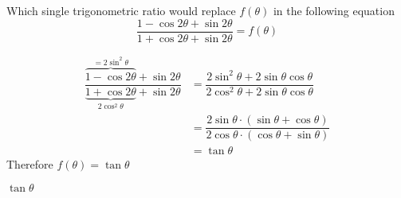 

\question[2] Which single trigonometric ratio would replace $f(\theta)$ in the 
  following equation
  \[ \dfrac{1-\cos 2\theta + \sin 2\theta}{1+\cos 2\theta + 
    \sin 2\theta} = f(\theta) \]

\begin{solution}[\halfpage]
  \begin{align}
    \dfrac{\overbrace{1-\cos 2\theta}^{=2\sin^2\theta} + \sin 2\theta}
    {\underbrace{1+\cos 2\theta}_{2\cos^2\theta} + \sin 2\theta} &= 
    \dfrac{2\sin^2\theta + 2\sin\theta\cos\theta}{2\cos^2\theta + 2\sin\theta\cos\theta} \\
    &= \dfrac{2\sin\theta\cdot (\sin\theta + \cos\theta )}
    {2\cos\theta\cdot (\cos\theta + \sin\theta)} \\
    &= \tan\theta
  \end{align}
  Therefore $f(\theta)=\tan\theta$
\end{solution}
\ifprintanswers\begin{codex}$\tan\theta$\end{codex}\fi
